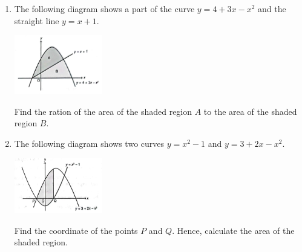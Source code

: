 \documentclass{report}
\begin{document}
\begin{multicols*}{2}
\begin{enumerate}
            \item The following diagram shows a part of the curve $y =4 +3x - x^2$ and the
                  straight line $y = x+1$.
                  \begin{center}
                        \includegraphics[width=0.3\textwidth,valign=t]{./images/23.png}
                  \end{center}
                  Find the ration of the area of the shaded region $A$ to the area of the shaded region $B$.

            \item The following diagram shows two curves $y = x^2 - 1$ and $y = 3+2x-x^2$.
                  \begin{center}
                        \includegraphics[width=0.3\textwidth,valign=t]{./images/24.png}
                  \end{center}
                  Find the coordinate of the points $P$ and $Q$. Hence, calculate the area of the shaded region.
      \end{enumerate}
\end{multicols*}
\end{document}
